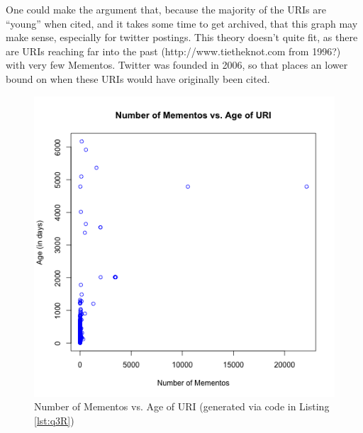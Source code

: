 \documentclass[letterpaper,11pt]{article}
\begin{document}
One could make the argument that, because the majority of the URIs are ``young'' when cited, and it takes some time to get archived, that this graph may make sense, especially for twitter postings.  This theory doesn't quite fit, as there are URIs reaching far into the past (http://www.tietheknot.com from 1996?) with very few Mementos.  Twitter was founded in 2006\cite{laracinisomo}, so that places an lower bound on when these URIs would have originally been cited.

\begin{figure}
\includegraphics[scale=0.56]{work/q3/q3-scatterplot.png}
\caption{Number of Mementos vs. Age of URI (generated via code in Listing \ref{lst:q3R})}
\label{fig:q3scatter}
\end{figure}

\newpage


\newpage


\newpage


\newpage


\newpage


\end{document}
